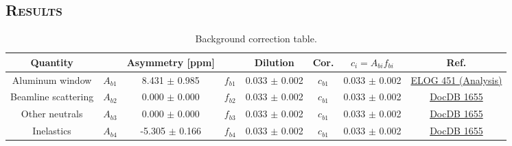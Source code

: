\documentclass[xcolor=x11names,compress,8pt]{beamer}
\renewcommand{\(}{\begin{columns}}
\renewcommand{\)}{\end{columns}}
\newcommand{\<}[1]{\begin{column}{#1}}
\renewcommand{\>}{\end{column}}
\begin{document}
\subsection{\scshape Results}

\fontsize{6pt}{7.2}\selectfont

\begin{center}

\begin{table}[h]
\begin{center}
  \begin{tabular}{@{} c @{}| @{} c  @{} c @{}|@{} c @{} c @{} |@{} c @{} c @{}| @{} c @{}}
    \hline
    Quantity	&	&	Asymmetry [ppm]	& 	& Dilution & Cor. & $c_{i}=A_{bi}f_{bi}$ & Ref.		\\
	\hline
	Aluminum window & $A_{b1}$ & 8.431 $\pm$ 0.985 & $f_{b1}$ & 0.033 $\pm$ 0.002 & $c_{b1}$ & 0.033 $\pm$ 0.002 &	\href{https://qweak.jlab.org/elog/Analysis+&+Simulation/451}{ELOG 451 (Analysis)}\cite{website:elog_adesh} 
	\\
	Beamline scattering & $A_{b2}$ & 0.000 $\pm$ 0.000 & $f_{b2}$ & 0.033 $\pm$ 0.002 & $c_{b1}$ & 0.033 $\pm$ 0.002 & \href{https://qweak.jlab.org/doc-private/ShowDocument?docid=1655}{DocDB 1655} \cite{buddhini_transverse_technote}	
	\\
	Other neutrals & $A_{b3}$ & 0.000 $\pm$ 0.000 	& $f_{b3}$ & 0.033 $\pm$ 0.002 & $c_{b1}$ & 0.033 $\pm$ 0.002 & 	\href{https://qweak.jlab.org/doc-private/ShowDocument?docid=1655}{DocDB 1655} \cite{buddhini_transverse_technote}	
	\\	
	Inelastics & $A_{b4}$ & -5.305 $\pm$ 0.166 & $f_{b4}$ & 0.033 $\pm$ 0.002 & $c_{b1}$ & 0.033 $\pm$ 0.002 &	\href{https://qweak.jlab.org/doc-private/ShowDocument?docid=1655}{DocDB 1655} \cite{buddhini_transverse_technote}	
	\\
    \hline
  	\end{tabular}
  	\caption[Background correction table.]{Background correction table.}
  \label{tabPhysicsAsymInput}
\end{center}
\end{table}

\end{center}

%
%
%
\end{document}
